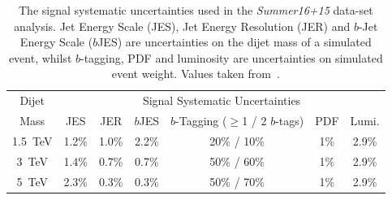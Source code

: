 \begin{table}[!htb]
  \centering
  \begin{tabular}{|c||c|c|c|c|c|c|}
    \hline
    Dijet   & \multicolumn{6}{c|}{Signal Systematic Uncertainties}                             \\ \cline{2-7} 
    Mass    & JES   & JER   & $b$JES  & $b$-Tagging ($\geq$1 / 2 $b$-tags) & PDF & Lumi.       \\
    \hline                                                                        
    1.5~TeV & 1.2\% & 1.0\% & 2.2\%   &        20\% / 10\%                 & 1\% & 2.9\%       \\
    3~TeV   & 1.4\% & 0.7\% & 0.7\%   &        50\% / 60\%                 & 1\% & 2.9\%       \\
    5~TeV   & 2.3\% & 0.3\% & 0.3\%   &        50\% / 70\%                 & 1\% & 2.9\%       \\
    \hline
  \end{tabular}
\caption[The signal systematic uncertainties used in the \textit{Summer16+15} data-set analysis.]
        {The signal systematic uncertainties used in the \textit{Summer16+15} data-set analysis.
          Jet Energy Scale (JES), Jet Energy Resolution (JER) and $b$-Jet Energy Scale ($b$JES)
          are uncertainties on the dijet mass of a simulated event,
          whilst $b$-tagging, PDF and luminosity are uncertainties on simulated event weight.
          Values taken from~\cite{dibjet-ichep_conf}.}
  \label{tab:lim-summer_syst}
  \end{table}


